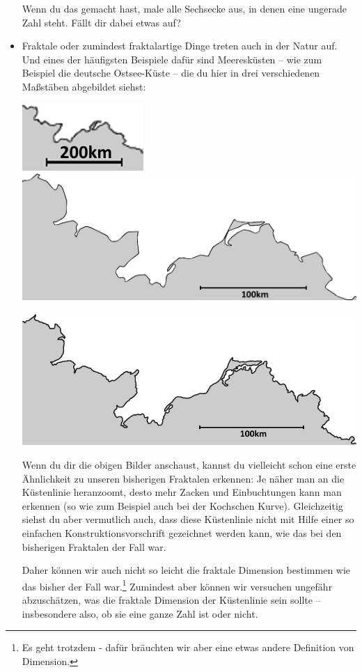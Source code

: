 \documentclass[a4paper,ngerman,12pt]{scrartcl}
\theoremstyle{definition}
\theoremstyle{plain}
\theoremstyle{remark}
\begin{document}
\begin{itemize}
		Wenn du das gemacht hast, male alle Sechsecke aus, in denen eine ungerade Zahl steht. Fällt dir dabei etwas auf?
		
	\item Fraktale oder zumindest fraktalartige Dinge treten auch in der Natur auf. Und eines der häufigsten Beispiele dafür sind Meeresküsten -- wie zum Beispiel die deutsche Ostsee-Küste -- die du hier in drei verschiedenen Maßstäben abgebildet siehst:
	
	\begin{center}
		\includegraphics[width=.25\textwidth]{Bilder/Ostsee1.png}
		\includegraphics[width=.65\textwidth]{Bilder/Ostsee2.png}
		
		\includegraphics[width=.9\textwidth]{Bilder/Ostsee3.png}
	\end{center}

	Wenn du dir die obigen Bilder anschaust, kannst du vielleicht schon eine erste Ähnlichkeit zu unseren bisherigen Fraktalen erkennen: Je näher man an die Küstenlinie heranzoomt, desto mehr Zacken und Einbuchtungen kann man erkennen (so wie zum Beispiel auch bei der Kochschen Kurve). Gleichzeitig siehst du aber vermutlich auch, dass diese Küstenlinie nicht mit Hilfe einer so einfachen Konstruktionsvorschrift gezeichnet werden kann, wie das bei den bisherigen Fraktalen der Fall war.
	
	Daher können wir auch nicht so leicht die fraktale Dimension bestimmen wie das bisher der Fall war.\footnote{Es geht trotzdem - dafür bräuchten wir aber eine etwas andere Definition von Dimension.} Zumindest aber können wir versuchen ungefähr abzuschätzen, was die fraktale Dimension der Küstenlinie sein sollte -- insbesondere also, ob sie eine ganze Zahl ist oder nicht.
	

\end{itemize}
\end{document}
